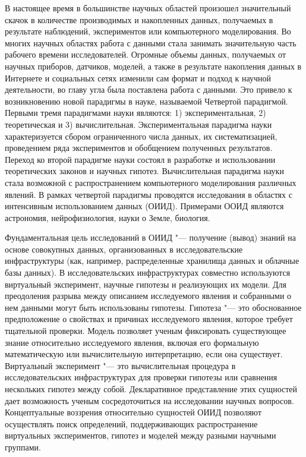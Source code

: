 
{\actuality} В настоящее время в большинстве научных областей произошел значительный скачок в количестве производимых 
и накопленных данных, получаемых в результате наблюдений, экспериментов или компьютерного моделирования. Во многих 
научных областях работа с данными стала занимать значительную часть рабочего времени исследователей. Огромные объемы 
данных, получаемых от научных приборов, датчиков, моделей, а также в результате накопления данных в Интернете и 
социальных сетях изменили сам формат и подход к научной деятельности, во главу угла была поставлена работа с данными. 
Это привело к возникновению новой парадигмы в науке, называемой Четвертой парадигмой. Первыми тремя парадигмами науки 
являются: 1) экспериментальная, 2) теоретическая и 3) вычислительная. Экспериментальная парадигма науки 
характеризуется сбором ограниченного числа данных, их систематизацией, проведением ряда экспериментов 
и обобщением полученных результатов. Переход ко второй парадигме науки состоял в разработке и 
использовании теоретических законов и научных гипотез. Вычислительная парадигма науки стала возможной с 
распространением компьютерного моделирования различных явлений.  В рамках четвертой парадигмы проводятся исследования 
в областях с интенсивным использованием данных (ОИИД). Примерами ООИД являются астрономия, 
нейрофизиология, науки о Земле, биология. 

Фундаментальная цель исследований в ОИИД "--- получение (вывод) знаний на основе совокупных данных, 
организованных в исследовательские инфраструктуры (как, например, распределенные хранилища данных и 
облачные базы данных). В исследовательских инфраструктурах совместно используются виртуальный эксперимент, научные 
гипотезы и реализующих их модели. Для преодоления разрыва между описанием исследуемого явления и собранными о нем 
данными могут быть  использованы гипотезы. Гипотеза "--- это обоснованное предположение о свойствах и причинах 
исследуемого явления, которое требует тщательной проверки. Модель позволяет ученым фиксировать 
существующее знание относительно исследуемого явления, включая его формальную математическую или вычислительную 
интерпретацию, если она существует. Виртуальный эксперимент "--- это вычислительная процедура 
в исследовательских инфраструктурах для проверки гипотезы или сравнения нескольких гипотез между собой.  
Декларативное представление этих сущностей дает возможность ученым сосредоточиться на исследовании научных вопросов. 
Концептуальные воззрения относительно сущностей ОИИД позволяют осуществлять поиск определений, 
поддерживающих распространение виртуальных экспериментов, гипотез и моделей между разными научными группами.

